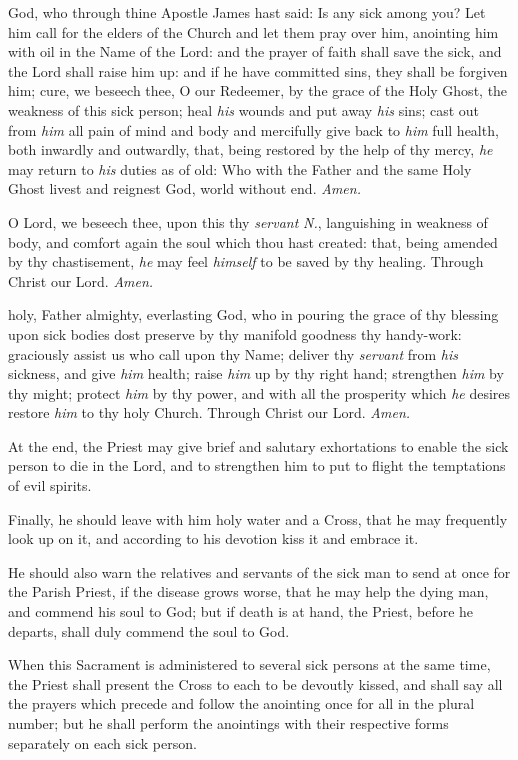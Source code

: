 {} God, who through thine Apostle James hast said: Is any sick among you? Let him call for the elders of the Church and let them pray over him, anointing him with oil in the Name of the Lord: and the prayer of faith shall save the sick, and the Lord shall raise him up: and if he have committed sins, they shall be forgiven him; cure, we beseech thee, O our Redeemer, by the grace of the Holy Ghost, the weakness of this sick person; heal \textit{his} wounds and put away \textit{his} sins; cast out from \textit{him} all pain of mind and body and mercifully give back to \textit{him} full health, both inwardly and outwardly, that, being restored by the help of thy mercy, \textit{he} may return to \textit{his} duties as of old: Who with the Father and the same Holy Ghost livest and reignest God, world without end. \textit{Amen.}\par
{}
{} O Lord, we beseech thee, upon this thy \textit{servant} \textit{N.}, languishing in weakness of body, and comfort again the soul which thou hast created: that, being amended by thy chastisement, \textit{he} may feel \textit{himself} to be saved by thy healing. Through Christ our Lord. \textit{Amen.}\par
{}
{} holy, Father almighty, everlasting God, who in pouring the grace of thy blessing upon sick bodies dost preserve by thy manifold goodness thy handy-work: graciously assist us who call upon thy Name; deliver thy \textit{servant} from \textit{his} sickness, and give \textit{him} health; raise \textit{him} up by thy right hand; strengthen \textit{him} by thy might; protect \textit{him} by thy power, and with all the prosperity which \textit{he} desires restore \textit{him} to thy holy Church. Through Christ our Lord. \textit{Amen.}
\begin{rubric}
    At the end, the Priest may give brief and salutary exhortations to enable the sick person to die in the Lord, and to strengthen him to put to flight the temptations of evil spirits.
\end{rubric}
\begin{rubric}
    Finally, he should leave with him holy water and a Cross, that he may frequently look up on it, and according to his devotion kiss it and embrace it.
\end{rubric}
\begin{rubric}
    He should also warn the relatives and servants of the sick man to send at once for the Parish Priest, if the disease grows worse, that he may help the dying man, and commend his soul to God; but if death is at hand, the Priest, before he departs, shall duly commend the soul to God.
\end{rubric}
\begin{rubric}
    When this Sacrament is administered to several sick persons at the same time, the Priest shall present the Cross to each to be devoutly kissed, and shall say all the prayers which precede and follow the anointing once for all in the plural number; but he shall perform the anointings with their respective forms separately on each sick person.
\end{rubric}
